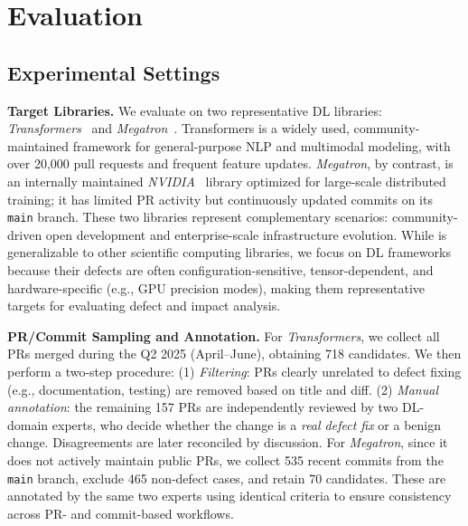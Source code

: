 \section{Evaluation}
\subsection{Experimental Settings}
\noindent \textbf{Target Libraries.}
We evaluate \appname on two representative DL libraries: \textit{Transformers}~\cite{transformers} and \textit{Megatron}~\cite{megatron}.
Transformers is a widely used, community-maintained framework for general-purpose NLP and multimodal modeling, with over 20,000 pull requests and frequent feature updates.
\textit{Megatron}, by contrast, is an internally maintained \textit{NVIDIA}~\cite{nvidia} library optimized for large-scale distributed training; it has limited PR activity but continuously updated commits on its \texttt{main} branch.
These two libraries represent complementary scenarios: community-driven open development and enterprise-scale infrastructure evolution.
While \appname is generalizable to other scientific computing libraries, we focus on DL frameworks because their defects are often configuration-sensitive, tensor-dependent, and hardware-specific (e.g., GPU precision modes), making them representative targets for evaluating defect and impact analysis.

\noindent \textbf{PR/Commit Sampling and Annotation.}
For \textit{Transformers}, we collect all PRs merged during the Q2 2025 (April–June), obtaining 718 candidates.
We then perform a two-step procedure:
(1) \textit{Filtering}: PRs clearly unrelated to defect fixing (e.g., documentation, testing) are removed based on title and diff.
(2) \textit{Manual annotation}: the remaining 157 PRs are independently reviewed by two DL-domain experts, who decide whether the change is a \emph{real defect fix} or a benign change. 
Disagreements are later reconciled by discussion.
For \textit{Megatron}, since it does not actively maintain public PRs, we collect 535 recent commits from the \texttt{main} branch, exclude 465 non-defect cases, and retain 70 candidates.
These are annotated by the same two experts using identical criteria to ensure consistency across PR- and commit-based workflows.


